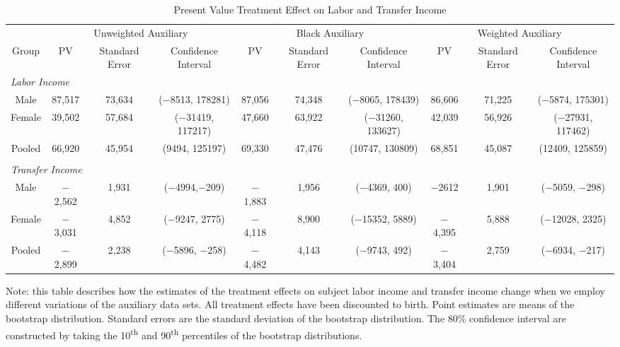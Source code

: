 \begin{sidewaystable}[H]
\footnotesize
\begin{threeparttable}
\caption{Present Value Treatment Effect on Labor and Transfer Income}
\label{tab:pv_income_compare}
\begin{tabular}{cccc|ccc|ccc}
\hline\hline
& \multicolumn{3}{c|}{Unweighted Auxiliary} & \multicolumn{3}{c|}{Black Auxiliary} & \multicolumn{3}{c}{Weighted Auxiliary} \\
Group & PV & Standard Error & Confidence Interval & PV & Standard Error & Confidence Interval & PV & Standard Error & Confidence Interval \\
\hline
\multicolumn{4}{l|}{\emph{Labor Income}} & & & & & & \\
Male & 87,517 & 73,634 & ($-$8513, 178281) & 87,056 & 74,348 & ($-$8065, 178439) & 86,606 & 71,225& ($-$5874, 175301)\\
Female & 39,502 & 57,684 & ($-$31419, 117217) & 47,660 & 63,922 & ($-$31260, 133627) & 42,039 & 56,926 & ($-$27931, 117462) \\
Pooled & 66,920 & 45,954 & (9494, 125197) & 69,330 & 47,476 & (10747, 130809) & 68,851 & 45,087& (12409, 125859) \\
& & & & & & & & & \\
\multicolumn{4}{l|}{\emph{Transfer Income}} & & & & & & \\
Male & $-$2,562 & 1,931 & ($-$4994,$-$209) & $-$1,883 & 1,956 & ($-$4369, 400) & $-$2612 & 1,901 & ($-$5059, $-$298) \\
Female & $-$3,031 & 4,852 & ($-$9247, 2775) & $-$4,118 & 8,900 & ($-$15352, 5889) & $-$4,395 & 5,888 & ($-$12028, 2325) \\
Pooled & $-$2,899 & 2,238 & ($-$5896, $-$258) & $-$4,482 & 4,143 & ($-$9743, 492) & $-$3,404 & 2,759  & ($-$6934, $-$217) \\
\hline\hline
\end{tabular}
\begin{tablenotes}
\footnotesize
\item Note: this table describes how the estimates of the treatment effects on 
subject labor income and transfer income change when we employ different variations of the 
auxiliary data sets. All treatment effects have been discounted to birth. 
Point estimates are means of the bootstrap distribution. Standard
errors are the standard deviation of the bootstrap distribution. The 80\%
confidence interval are constructed by taking the 10\textsuperscript{th} and 
90\textsuperscript{th} percentiles of the bootstrap distributions. 
\end{tablenotes}
\end{threeparttable}
\end{sidewaystable}
